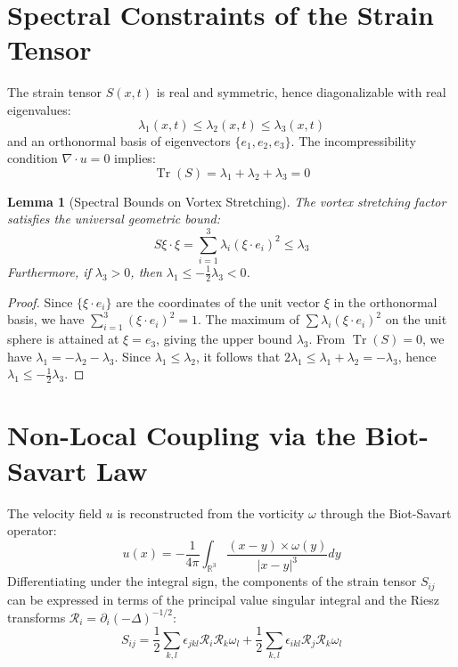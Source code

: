 \documentclass[11pt,a4paper]{article}
\newtheorem{lemma}[theorem]{Lemma}
\theoremstyle{definition}
\begin{document}
\section{Spectral Constraints of the Strain Tensor}
The strain tensor $S(x,t)$ is real and symmetric, hence diagonalizable with real eigenvalues:
\begin{equation}
\lambda_1(x,t) \le \lambda_2(x,t) \le \lambda_3(x,t)
\end{equation}
and an orthonormal basis of eigenvectors $\{e_1, e_2, e_3\}$.
The incompressibility condition $\nabla \cdot u = 0$ implies:
\begin{equation}
\operatorname{Tr}(S) = \lambda_1 + \lambda_2 + \lambda_3 = 0 \label{trace_zero}
\end{equation}

\begin{lemma}[Spectral Bounds on Vortex Stretching]
The vortex stretching factor satisfies the universal geometric bound:
\begin{equation}
S\xi \cdot \xi = \sum_{i=1}^3 \lambda_i (\xi \cdot e_i)^2 \le \lambda_3
\end{equation}
Furthermore, if $\lambda_3 > 0$, then $\lambda_1 \le -\frac{1}{2} \lambda_3 < 0$.
\end{lemma}
\begin{proof}
Since $\{\xi \cdot e_i\}$ are the coordinates of the unit vector $\xi$ in the orthonormal basis, we have $\sum_{i=1}^3 (\xi \cdot e_i)^2 = 1$. The maximum of $\sum \lambda_i (\xi \cdot e_i)^2$ on the unit sphere is attained at $\xi = e_3$, giving the upper bound $\lambda_3$.
From $\operatorname{Tr}(S) = 0$, we have $\lambda_1 = -\lambda_2 - \lambda_3$. Since $\lambda_1 \le \lambda_2$, it follows that $2\lambda_1 \le \lambda_1 + \lambda_2 = -\lambda_3$, hence $\lambda_1 \le -\frac{1}{2} \lambda_3$.
\end{proof}

\section{Non-Local Coupling via the Biot-Savart Law}
The velocity field $u$ is reconstructed from the vorticity $\omega$ through the Biot-Savart operator:
\begin{equation}
u(x) = -\frac{1}{4\pi} \int_{\mathbb{R}^3} \frac{(x-y) \times \omega(y)}{|x-y|^3} dy
\end{equation}
Differentiating under the integral sign, the components of the strain tensor $S_{ij}$ can be expressed in terms of the principal value singular integral and the Riesz transforms $\mathcal{R}_i = \partial_i (-\Delta)^{-1/2}$:
\begin{equation}
S_{ij} = \frac{1}{2} \sum_{k,l} \epsilon_{jkl} \mathcal{R}_i \mathcal{R}_k \omega_l + \frac{1}{2} \sum_{k,l} \epsilon_{ikl} \mathcal{R}_j \mathcal{R}_k \omega_l
\end{equation}
\end{document}
